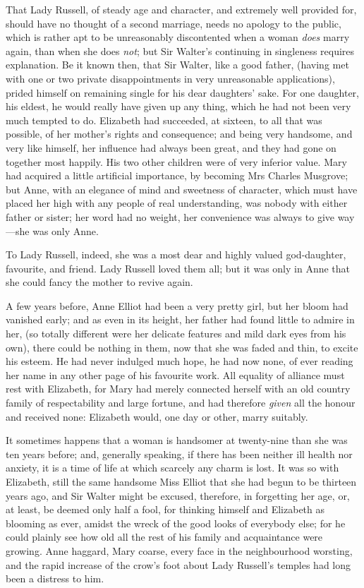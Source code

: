 That Lady Russell, of steady age and character, and extremely well provided for, should have no thought of a second marriage, needs no apology to the public, which is rather apt to be unreasonably discontented when a woman \textit{does} marry again, than when she does \textit{not}; but Sir Walter's continuing in singleness requires explanation. Be it known then, that Sir Walter, like a good father, (having met with one or two private disappointments in very unreasonable applications), prided himself on remaining single for his dear daughters' sake. For one daughter, his eldest, he would really have given up any thing, which he had not been very much tempted to do. Elizabeth had succeeded, at sixteen, to all that was possible, of her mother's rights and consequence; and being very handsome, and very like himself, her influence had always been great, and they had gone on together most happily. His two other children were of very inferior value. Mary had acquired a little artificial importance, by becoming Mrs Charles Musgrove; but Anne, with an elegance of mind and sweetness of character, which must have placed her high with any people of real understanding, was nobody with either father or sister; her word had no weight, her convenience was always to give way—she was only Anne.

To Lady Russell, indeed, she was a most dear and highly valued god-daughter, favourite, and friend. Lady Russell loved them all; but it was only in Anne that she could fancy the mother to revive again.

A few years before, Anne Elliot had been a very pretty girl, but her bloom had vanished early; and as even in its height, her father had found little to admire in her, (so totally different were her delicate features and mild dark eyes from his own), there could be nothing in them, now that she was faded and thin, to excite his esteem. He had never indulged much hope, he had now none, of ever reading her name in any other page of his favourite work. All equality of alliance must rest with Elizabeth, for Mary had merely connected herself with an old country family of respectability and large fortune, and had therefore \textit{given} all the honour and received none: Elizabeth would, one day or other, marry suitably.

It sometimes happens that a woman is handsomer at twenty-nine than she was ten years before; and, generally speaking, if there has been neither ill health nor anxiety, it is a time of life at which scarcely any charm is lost. It was so with Elizabeth, still the same handsome Miss Elliot that she had begun to be thirteen years ago, and Sir Walter might be excused, therefore, in forgetting her age, or, at least, be deemed only half a fool, for thinking himself and Elizabeth as blooming as ever, amidst the wreck of the good looks of everybody else; for he could plainly see how old all the rest of his family and acquaintance were growing. Anne haggard, Mary coarse, every face in the neighbourhood worsting, and the rapid increase of the crow's foot about Lady Russell's temples had long been a distress to him.

